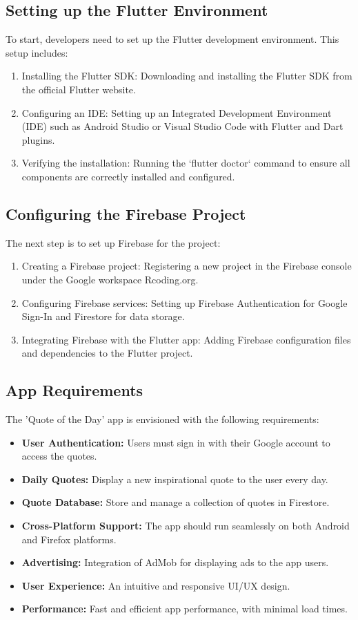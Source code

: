 \documentclass{book}
\begin{document}
\subsection{Setting up the Flutter Environment}
To start, developers need to set up the Flutter development environment. This setup includes:
\begin{enumerate}
    \item Installing the Flutter SDK: Downloading and installing the Flutter SDK from the official Flutter website.
    \item Configuring an IDE: Setting up an Integrated Development Environment (IDE) such as Android Studio or Visual Studio Code with Flutter and Dart plugins.
    \item Verifying the installation: Running the `flutter doctor` command to ensure all components are correctly installed and configured.
\end{enumerate}

\subsection{Configuring the Firebase Project}
The next step is to set up Firebase for the project:
\begin{enumerate}
    \item Creating a Firebase project: Registering a new project in the Firebase console under the Google workspace Rcoding.org.
    \item Configuring Firebase services: Setting up Firebase Authentication for Google Sign-In and Firestore for data storage.
    \item Integrating Firebase with the Flutter app: Adding Firebase configuration files and dependencies to the Flutter project.
\end{enumerate}

\subsection{App Requirements}
The 'Quote of the Day' app is envisioned with the following requirements:
\begin{itemize}
    \item \textbf{User Authentication:} Users must sign in with their Google account to access the quotes.
    \item \textbf{Daily Quotes:} Display a new inspirational quote to the user every day.
    \item \textbf{Quote Database:} Store and manage a collection of quotes in Firestore.
    \item \textbf{Cross-Platform Support:} The app should run seamlessly on both Android and Firefox platforms.
    \item \textbf{Advertising:} Integration of AdMob for displaying ads to the app users.
    \item \textbf{User Experience:} An intuitive and responsive UI/UX design.
    \item \textbf{Performance:} Fast and efficient app performance, with minimal load times.
\end{itemize}
\end{document}
